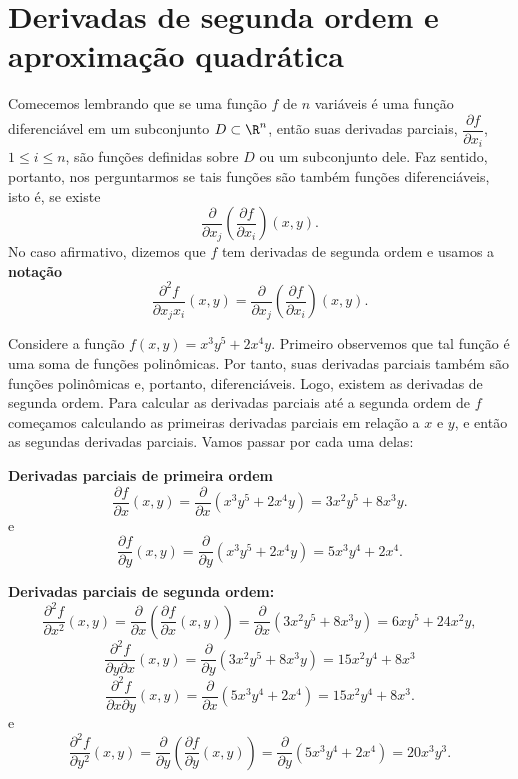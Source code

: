 \setcounter{chapter}{7}
\chapter{Derivadas de segunda ordem e aproximação quadrática}

Comecemos lembrando que se uma função $f$ de $n$ variáveis é uma função diferenciável em um subconjunto $D\subset\R^n$, então suas derivadas parciais, $\dfrac{\partial f}{\partial x_i}$, $1\leq i \leq n$, são funções definidas sobre $D$ ou um subconjunto dele. Faz sentido, portanto, nos perguntarmos se tais funções são também funções diferenciáveis, isto é, se existe 
$$\dfrac{\partial}{\partial x_j}\left(\dfrac{\partial f}{\partial x_i}\right)(x,y).$$
No caso afirmativo, dizemos que $f$ tem derivadas de segunda ordem e usamos a \textbf{notação}
$$\dfrac{\partial ^2 f}{\partial x_j x_i}(x,y)=\dfrac{\partial}{\partial x_j}\left(\dfrac{\partial f}{\partial x_i}\right)(x,y).$$
\begin{example}{}{}
Considere a função  $f(x,y)=x^3y^5+2x^4y$. Primeiro observemos que tal função é uma soma de funções polinômicas. Por tanto, suas derivadas parciais também são funções polinômicas e, portanto, diferenciáveis. Logo, existem as derivadas de segunda ordem. 
Para calcular as derivadas parciais até a segunda ordem de \(f\) começamos calculando as primeiras derivadas parciais em relação a \(x\) e \(y\), e então as segundas derivadas parciais. Vamos passar por cada uma delas:

\newpage
\textbf{Derivadas parciais de primeira ordem}
   \[\dfrac{\partial f}{\partial x} (x,y)= \dfrac{\partial}{\partial x} (x^3y^5 + 2x^4y) = 3x^2y^5 + 8x^3y.\]
e
   \[\dfrac{\partial f}{\partial y} (x,y) = \dfrac{\partial}{\partial y} (x^3y^5 + 2x^4y) = 5x^3y^4 + 2x^4.\]

\textbf{Derivadas parciais de segunda ordem:}
   \[\dfrac{\partial^2 f}{\partial x^2}(x,y) = 
   \dfrac{\partial}{\partial x}\left(\dfrac{\partial f}{\partial x} (x,y) \right)  = \dfrac{\partial}{\partial x} (3x^2y^5 + 8x^3y) = 6xy^5 + 24x^2y,\]
   \[\dfrac{\partial^2 f}{\partial y \partial x} (x,y) = \dfrac{\partial}{\partial y} (3x^2y^5 + 8x^3y) = 15x^2y^4 + 8x^3\]   
   \[\dfrac{\partial^2 f}{\partial x \partial y} (x,y) = \dfrac{\partial}{\partial x} (5x^3y^4 + 2x^4) = 15x^2y^4 + 8x^3.\]
e
   \[\dfrac{\partial^2 f}{\partial y^2}(x,y) = 
   \dfrac{\partial}{\partial y}\left(\dfrac{\partial f}{\partial y} (x,y) \right)
   = \dfrac{\partial}{\partial y} (5x^3y^4 + 2x^4) = 20x^3y^3.\]


    
\end{example}
   


